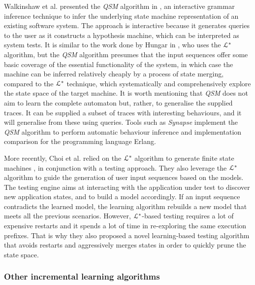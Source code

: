 Walkinshaw et al. presented the \textit{QSM} algorithm in
\cite{Walkinshaw07reverseengineering}, an interactive grammar
inference technique to infer the underlying state machine
representation of an existing software system. The approach is
interactive because it generates queries to the user as it
constructs a hypothesis machine, which can be interpreted as
system tests. It is similar to the work done by Hungar in
\cite{hungar}, who uses the $\EuScript{L}^*$ algorithm, but the
\textit{QSM} algorithm presumes that the input sequences offer
some basic coverage of the essential functionality of the system,
in which case the machine can be inferred relatively cheaply by a
process of state merging, compared to the $\EuScript{L}^*$
technique, which systematically and comprehensively explore the
state space of the target machine. It is worth mentioning that
\textit{QSM} does not aim to learn the complete automaton but,
rather, to generalise the supplied traces. It can be supplied a
subset of traces with interesting behaviours, and it will
generalise from these using queries. Tools such as
\textit{Synapse} \cite{LamelaSeijas:2014:SAB:2633448.2633457}
implement the \textit{QSM} algorithm to perform automatic
behaviour inference and implementation comparison for the
programming language Erlang.

More recently, Choi et al. relied on the $\EuScript{L}^*$
algorithm to generate finite state machines \cite{Choi2013}, in
conjunction with a testing approach. They also leverage the
$\EuScript{L}^*$ algorithm to guide the generation of user input
sequences based on the models. The testing engine aims at
interacting with the application under test to discover new
application states, and to build a model accordingly. If an input
sequence contradicts the learned model, the learning algorithm
rebuilds a new model that meets all the previous scenarios.
However, $\EuScript{L}^*$-based testing requires a lot of
expensive restarts and it spends a lot of time in re-exploring
the same execution prefixes. That is why they also proposed a
novel learning-based testing algorithm that avoids restarts and
aggressively merges states in order to quickly prune the state
space.


\subsubsection{Other incremental learning algorithms}
\label{sec:related:modelinf:active-increment}


